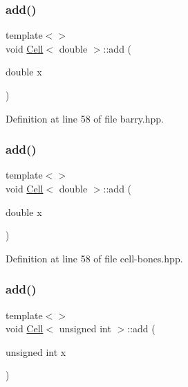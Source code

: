 \mbox{\label{class_cell_a64d4b92f322ccb8cfbad53f816d2caf8}} 
\subsubsection{\texorpdfstring{add()}{add()}\hspace{0.1cm}{\footnotesize\ttfamily [2/9]}}
{\footnotesize\ttfamily template$<$$>$ \\
void \hyperlink{class_cell}{Cell}$<$ double $>$\+::add (\begin{DoxyParamCaption}\item[{double}]{x }\end{DoxyParamCaption})\hspace{0.3cm}{\ttfamily [inline]}}



Definition at line 58 of file barry.\+hpp.

\mbox{\label{class_cell_a64d4b92f322ccb8cfbad53f816d2caf8}} 
\subsubsection{\texorpdfstring{add()}{add()}\hspace{0.1cm}{\footnotesize\ttfamily [3/9]}}
{\footnotesize\ttfamily template$<$$>$ \\
void \hyperlink{class_cell}{Cell}$<$ double $>$\+::add (\begin{DoxyParamCaption}\item[{double}]{x }\end{DoxyParamCaption})\hspace{0.3cm}{\ttfamily [inline]}}



Definition at line 58 of file cell-\/bones.\+hpp.

\mbox{\label{class_cell_ae22060201cf692bbf219827453d0acd2}} 
\subsubsection{\texorpdfstring{add()}{add()}\hspace{0.1cm}{\footnotesize\ttfamily [4/9]}}
{\footnotesize\ttfamily template$<$$>$ \\
void \hyperlink{class_cell}{Cell}$<$ unsigned int $>$\+::add (\begin{DoxyParamCaption}\item[{unsigned int}]{x }\end{DoxyParamCaption})\hspace{0.3cm}{\ttfamily [inline]}}



